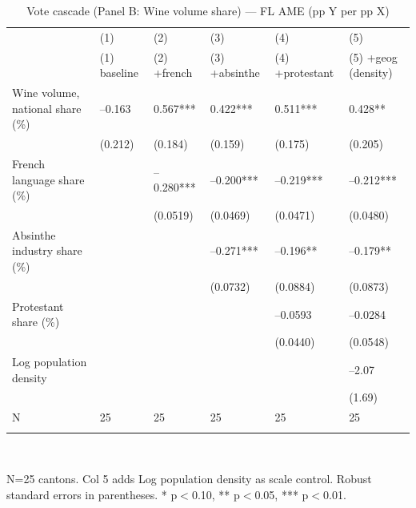 \begin{table}[tbp] \centering
{}

\caption{Vote cascade (Panel B: Wine volume share) --- FL AME (pp Y per pp X)}
\label{tab:T2_X2_FL}
\begin{tabularx}{\linewidth}{@{}lCCCCC@{}}

\toprule
&{(1)}&{(2)}&{(3)}&{(4)}&{(5)} \tabularnewline
 & (1) baseline & (2) +french & (3) +absinthe & (4) +protestant & (5) +geog (density) \tabularnewline 
\midrule \addlinespace[\belowrulesep]
Wine volume, national share (\%)&--0.163&0.567***&0.422***&0.511***&0.428** \tabularnewline
&(0.212)&(0.184)&(0.159)&(0.175)&(0.205) \tabularnewline
French language share (\%)&&--0.280***&--0.200***&--0.219***&--0.212*** \tabularnewline
&&(0.0519)&(0.0469)&(0.0471)&(0.0480) \tabularnewline
Absinthe industry share (\%)&&&--0.271***&--0.196**&--0.179** \tabularnewline
&&&(0.0732)&(0.0884)&(0.0873) \tabularnewline
Protestant share (\%)&&&&--0.0593&--0.0284 \tabularnewline
&&&&(0.0440)&(0.0548) \tabularnewline
Log population density&&&&&--2.07 \tabularnewline
&&&&&(1.69) \tabularnewline
\midrule N&25&25&25&25&25 \tabularnewline
\bottomrule \addlinespace[\belowrulesep]

\end{tabularx}
\\ \parbox{\linewidth}{\footnotesize N=25 cantons. Col 5 adds Log population density as scale control. Robust standard errors in parentheses. * p\(<\)0.10, ** p\(<\)0.05, *** p\(<\)0.01.}
\end{table}
